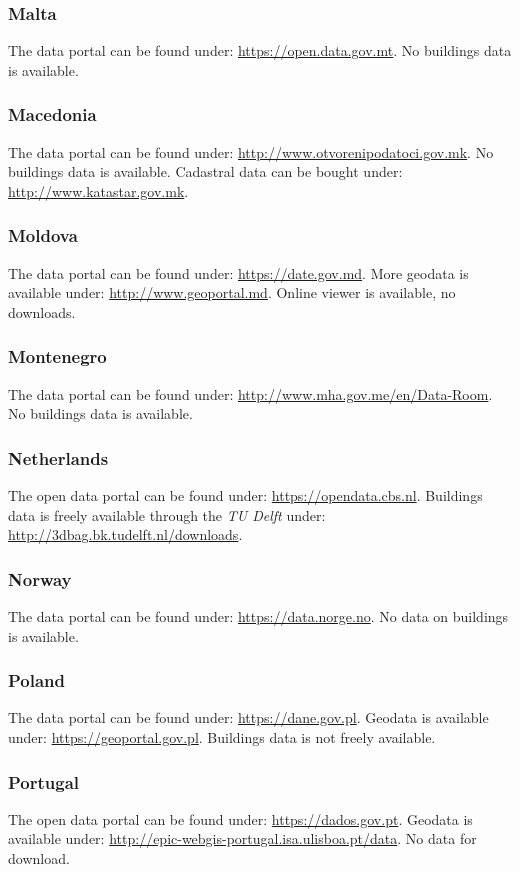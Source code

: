 \documentclass[final, 3p, times, 12pt]{elsarticle} %
\begin{document}
\subsubsection{Malta}
The data portal can be found under: \url{https://open.data.gov.mt}. No buildings data is available.
\subsubsection{Macedonia}
The data portal can be found under: \url{http://www.otvorenipodatoci.gov.mk}. No buildings data is available. Cadastral data can be bought under: \url{ http://www.katastar.gov.mk}.
\subsubsection{Moldova}
The data portal can be found under: \url{https://date.gov.md}. More geodata is available under: \url{http://www.geoportal.md}. Online viewer is available, no downloads.
\subsubsection{Montenegro}
The data portal can be found under: \url{http://www.mha.gov.me/en/Data-Room}. No buildings data is available.
\subsubsection{Netherlands}
The open data portal can be found under: \url{https://opendata.cbs.nl}. Buildings data is freely available through the \emph{TU Delft} under: \url{http://3dbag.bk.tudelft.nl/downloads}.
\subsubsection{Norway}
The data portal can be found under: \url{https://data.norge.no}. No data on buildings is available.
\subsubsection{Poland}
The data portal can be found under: \url{https://dane.gov.pl}. Geodata is available under: \url{https://geoportal.gov.pl}. Buildings data is not freely available.
\subsubsection{Portugal}
The open data portal can be found under: \url{https://dados.gov.pt}. Geodata is available under: \url{http://epic-webgis-portugal.isa.ulisboa.pt/data}. No data for download.
\end{document}
